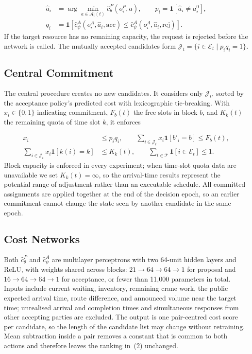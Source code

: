 \documentclass[a4paper]{llncs}
\begin{document}
\begin{equation}
\begin{aligned}
\hat a_i&=\arg\min_{a\in\mathcal A_i(t)}
\hat c_{\theta}^{P}(o_i^P,a),\qquad
p_i=\mathbf 1[\hat a_i\ne a_i^0],\\
q_i&=\mathbf 1\!\left[
\hat c_{\psi}^{A}(o_i^A,\hat a_i,\mathrm{acc})
\le
\hat c_{\psi}^{A}(o_i^A,\hat a_i,\mathrm{rej})
\right].
\end{aligned}
\end{equation}
If the target resource has no remaining capacity, the request is
rejected before the network is called. The mutually accepted candidates
form $\mathcal J_t=\{i\in\mathcal E_t\mid p_iq_i=1\}$.

\subsection{Central Commitment}
\label{sec:arch-commit}
The central procedure creates no new candidates. It considers only
$\mathcal J_t$, sorted by the acceptance policy's predicted cost with
lexicographic tie-breaking. With $x_i\in\{0,1\}$ indicating commitment,
$F_b(t)$ the free slots in block $b$, and $K_k(t)$ the remaining quota
of time slot $k$, it enforces

\begin{equation}
\begin{aligned}
x_i&\le p_iq_i,\qquad
\sum_{i\in\mathcal J_t}\!x_i\mathbf1[b'_i\!=\!b]\le F_b(t),\\
\sum_{i\in\mathcal J_t}\!x_i\mathbf1[k(i)\!=\!k]&\le K_k(t),\qquad
\sum_{t\in\mathcal T}\!\mathbf1[i\in\mathcal E_t]\le1.
\end{aligned}
\end{equation}
Block capacity is enforced in every experiment; when time-slot quota
data are unavailable we set $K_k(t)=\infty$, so the arrival-time results
represent the potential range of adjustment rather than an executable
schedule. All committed assignments are applied together at the end of
the decision epoch, so an earlier commitment cannot change the state
seen by another candidate in the same epoch.

\subsection{Cost Networks}
\label{sec:arch-models}
Both $\hat c^{P}_{\theta}$ and $\hat c^{A}_{\psi}$ are multilayer
perceptrons with two 64-unit hidden layers and ReLU, with weights shared
across blocks: $21\to64\to64\to1$ for proposal and $16\to64\to64\to1$
for acceptance, or fewer than 11{,}000 parameters in total. Inputs
include current waiting, inventory, remaining crane work, the public
expected arrival time, route difference, and announced volume near the
target time; unrealised arrival and completion times and simultaneous
responses from other accepting parties are excluded. The output is one
pair-centred cost score per candidate, so the length of the candidate
list may change without retraining. Mean subtraction inside a pair
removes a constant that is common to both actions and therefore leaves
the ranking in~(2) unchanged.
\end{document}
